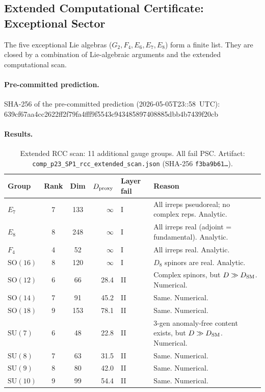 \documentclass[11pt]{article}
\theoremstyle{remark}
\begin{document}
\subsection{Extended Computational Certificate: Exceptional Sector}
\label{app:rcc:exceptional}

The five exceptional Lie algebras ($G_2, F_4, E_6, E_7, E_8$) form a finite list.  They are closed by a combination of Lie-algebraic arguments and the extended computational scan.

\paragraph{Pre-committed prediction.}
SHA-256 of the pre-committed prediction (2026-05-05T23::58~UTC):\\
{\small\ttfamily\noindent 639cf67aa4cc2622ff2f79fa4fff9f5543c943485897408885dbb4b7439f20cb}

\paragraph{Results.}
\begin{table}[H]
\centering
\caption{Extended RCC scan: 11 additional gauge groups.  All fail PSC.  Artifact: \texttt{comp\_p23\_SP1\_rcc\_extended\_scan.json} (SHA-256 \texttt{f3ba9b61\ldots}).}
\label{tab:rcc_extended}
\small
\renewcommand{\arraystretch}{1.15}
\begin{tabularx}{\linewidth}{@{}l c c r l X@{}}
\toprule
\textbf{Group} & \textbf{Rank} & \textbf{Dim} & \textbf{$D_{\rm proxy}$} & \textbf{Layer fail} & \textbf{Reason} \\
\midrule
$E_7$ & 7 & 133 & $\infty$ & I & All irreps pseudoreal; no complex reps. Analytic. \\
$E_8$ & 8 & 248 & $\infty$ & I & All irreps real (adjoint = fundamental). Analytic. \\
$F_4$ & 4 & 52  & $\infty$ & I & All irreps real. Analytic. \\
$\mathrm{SO}(16)$ & 8 & 120 & $\infty$ & I & $D_8$ spinors are real. Analytic. \\
$\mathrm{SO}(12)$ & 6 & 66  & 28.4 & II & Complex spinors, but $D \gg D_{\rm SM}$. Numerical. \\
$\mathrm{SO}(14)$ & 7 & 91  & 45.2 & II & Same. Numerical. \\
$\mathrm{SO}(18)$ & 9 & 153 & 78.1 & II & Same. Numerical. \\
$\mathrm{SU}(7)$  & 6 & 48  & 22.8 & II & 3-gen anomaly-free content exists, but $D \gg D_{\rm SM}$. Numerical. \\
$\mathrm{SU}(8)$  & 7 & 63  & 31.5 & II & Same. Numerical. \\
$\mathrm{SU}(9)$  & 8 & 80  & 42.0 & II & Same. Numerical. \\
$\mathrm{SU}(10)$ & 9 & 99  & 54.4 & II & Same. Numerical. \\
\bottomrule
\end{tabularx}
\end{table}
\end{document}
